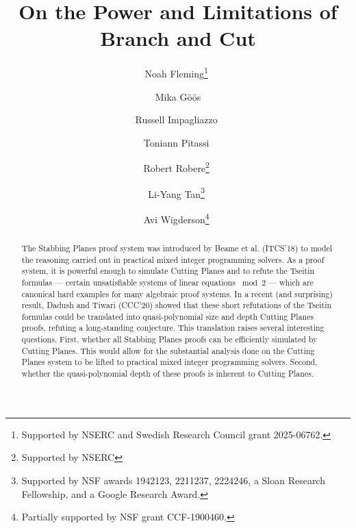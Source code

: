 \documentclass{toc}
\begin{document}
\begin{frontmatter}%

%
%
%

%
\title{On the Power and Limitations of Branch and Cut  %
}  %

%
%

%
%
%
%
%
%

%
%
%
%
%
%
%
%
%
%
%
%


%
%
%
%

%

%

\author[fleming]{Noah Fleming\thanks{Supported by NSERC and Swedish Research Council grant 2025-06762.}\,\,}
%
\author[goos]{Mika G\"o\"os}
\author[impagliazzo]{Russell Impagliazzo\,\,}
\author[pitassi]{Toniann Pitassi\,\,}
\author[robere]{Robert Robere\thanks{Supported by NSERC}\,\,}
\author[tan]{Li-Yang Tan\thanks{Supported by NSF awards 1942123, 2211237, 2224246, a Sloan Research Fellowship, and a Google Research Award.}\,\,}
\author[wigderson]{Avi Wigderson\thanks{Partially supported by NSF grant CCF-1900460.}\,\,}

%
%
%
%

%
%
%
%
%
%
%
%
\begin{abstract}
The Stabbing Planes proof system %
was introduced by Beame et al. (ITCS'18)   %
to model the reasoning carried out in practical mixed integer programming solvers. As a proof system, it is powerful enough to simulate Cutting Planes and to refute the Tseitin formulas 
--- certain unsatisfiable systems of linear equations $\bmod 2$ --- which are canonical hard examples for many algebraic proof systems. In a recent (and surprising) result, Dadush and Tiwari %
(CCC'20)    %
showed that these short refutations of the Tseitin formulas could be translated into quasi-polynomial size and depth Cutting Planes proofs, refuting a long-standing conjecture. 
This translation raises several interesting questions. First, whether all Stabbing Planes proofs can be efficiently simulated by Cutting Planes. This would allow for the substantial analysis done on the Cutting Planes system to be lifted to practical mixed integer programming solvers. Second, whether the quasi-polynomial depth of these proofs is inherent to Cutting Planes. 


\end{abstract}
\end{frontmatter}
\end{document}
